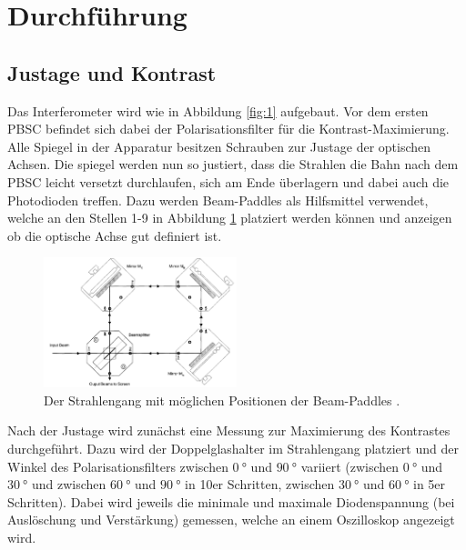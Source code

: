 \documentclass[
  bibliography=totoc,     %
  captions=tableheading,  %
  titlepage=firstiscover, %
]{scrartcl}
\begin{document}
\section{Durchführung}
\label{sec:durchführung}
\subsection{Justage und Kontrast}
\label{sub:justkontrast}
Das Interferometer wird wie in Abbildung \ref{fig:1} aufgebaut. Vor dem ersten PBSC
befindet sich dabei der Polarisationsfilter für die Kontrast-Maximierung.
Alle Spiegel in der Apparatur besitzen Schrauben zur Justage der optischen Achsen.
Die spiegel werden nun so justiert, dass die Strahlen die Bahn nach dem PBSC
leicht versetzt durchlaufen, sich am Ende überlagern und dabei auch die
Photodioden treffen. Dazu werden Beam-Paddles als Hilfsmittel verwendet,
welche an den Stellen 1-9 in Abbildung \ref{fig:2} platziert werden können und
anzeigen ob die optische Achse gut definiert ist.
\begin{figure}[H]
  \centering
  \includegraphics[width=0.5\textwidth]{Bild2.png}
  \caption{Der Strahlengang mit möglichen Positionen der Beam-Paddles \cite{anleitung}.}
  \label{fig:2}
\end{figure}
\noindent
Nach der Justage wird zunächst eine Messung zur Maximierung des Kontrastes durchgeführt.
Dazu wird der Doppelglashalter im Strahlengang platziert und der Winkel des
Polarisationsfilters zwischen $\SI{0}{\degree}$ und $\SI{90}{\degree}$ variiert
(zwischen $\SI{0}{\degree}$ und $\SI{30}{\degree}$ und zwischen $\SI{60}{\degree}$
und $\SI{90}{\degree}$ in 10er Schritten, zwischen $\SI{30}{\degree}$ und
$\SI{60}{\degree}$ in 5er Schritten). Dabei wird jeweils die minimale und maximale Diodenspannung
(bei Auslöschung und Verstärkung) gemessen, welche an einem Oszilloskop angezeigt wird.
\end{document}
